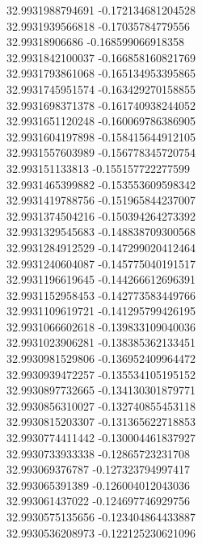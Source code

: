 {32.9931988794691	-0.172134681204528\\
32.9931939566818	-0.17035784779556\\
32.99318906686	-0.168599066918358\\
32.9931842100037	-0.166858160821769\\
32.9931793861068	-0.165134953395865\\
32.9931745951574	-0.163429270158855\\
32.9931698371378	-0.161740938244052\\
32.9931651120248	-0.160069786386905\\
32.9931604197898	-0.158415644912105\\
32.9931557603989	-0.156778345720754\\
32.993151133813	-0.155157722277599\\
32.9931465399882	-0.153553609598342\\
32.9931419788756	-0.151965844237007\\
32.9931374504216	-0.150394264273392\\
32.9931329545683	-0.148838709300568\\
32.9931284912529	-0.147299020412464\\
32.9931240604087	-0.145775040191517\\
32.9931196619645	-0.144266612696391\\
32.9931152958453	-0.142773583449766\\
32.9931109619721	-0.141295799426195\\
32.9931066602618	-0.139833109040036\\
32.9931023906281	-0.138385362133451\\
32.9930981529806	-0.136952409964472\\
32.9930939472257	-0.135534105195152\\
32.9930897732665	-0.134130301879771\\
32.9930856310027	-0.132740855453118\\
32.9930815203307	-0.131365622718853\\
32.9930774411442	-0.130004461837927\\
32.9930733933338	-0.12865723231708\\
32.993069376787	-0.127323794997417\\
32.993065391389	-0.126004012043036\\
32.993061437022	-0.124697746929756\\
32.9930575135656	-0.123404864433887\\
32.9930536208973	-0.122125230621096\\
}
